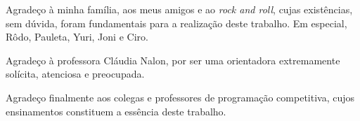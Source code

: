 \indent

Agradeço à minha família, aos meus amigos e ao \textit{rock and roll}, cujas existências, sem dúvida, foram fundamentais para a realização deste trabalho. Em especial, Rôdo, Pauleta, Yuri, Joni e Ciro.

Agradeço à professora Cláudia Nalon, por ser uma orientadora extremamente solícita, atenciosa e preocupada.

Agradeço finalmente aos colegas e professores de programação competitiva, cujos ensinamentos constituem a essência deste trabalho.